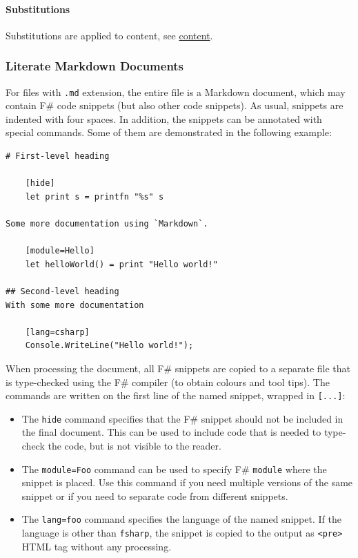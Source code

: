 \documentclass{article}
\begin{document}
\paragraph{Substitutions}



Substitutions are applied to content, see \href{content.html}{content}.
\subsubsection*{Literate Markdown Documents}



For files with \texttt{.md} extension, the entire file is a Markdown document, which may
contain F\# code snippets (but also other code snippets). As usual, snippets are
indented with four spaces. In addition, the snippets can be annotated with special
commands. Some of them are demonstrated in the following example:
\begin{lstlisting}
# First-level heading

    [hide]
    let print s = printfn "%s" s

Some more documentation using `Markdown`.

    [module=Hello]
    let helloWorld() = print "Hello world!"

## Second-level heading
With some more documentation

    [lang=csharp]
    Console.WriteLine("Hello world!");

\end{lstlisting}


When processing the document, all F\# snippets are copied to a separate file that
is type-checked using the F\# compiler (to obtain colours and tool tips).
The commands are written on the first line of the named snippet, wrapped in \texttt{[...]}:
\begin{itemize}
\item 

The \texttt{hide} command specifies that the F\# snippet should not be included in the
final document. This can be used to include code that is needed to type-check
the code, but is not visible to the reader.

\item 

The \texttt{module=Foo} command can be used to specify F\# \texttt{module} where the snippet
is placed. Use this command if you need multiple versions of the same snippet
or if you need to separate code from different snippets.

\item 

The \texttt{lang=foo} command specifies the language of the named snippet. If the language
is other than \texttt{fsharp}, the snippet is copied to the output as \texttt{<pre>} HTML
tag without any processing.

\end{itemize}
\end{document}
